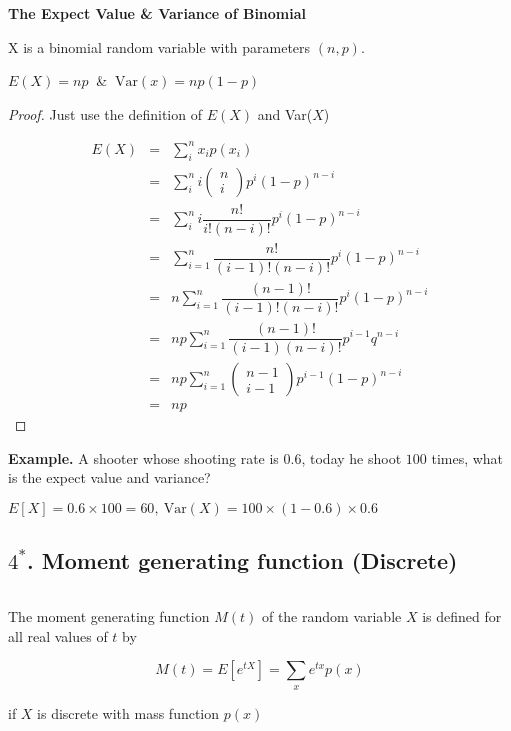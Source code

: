 \newpage

\textbf{The Expect Value \& Variance of Binomial}
$ $

X is a binomial random variable with parameters $(n,p)$.

\begin{center}
	$E(X) = np~$ \& $~\text{Var}(x) = np(1-p)$
\end{center}

\begin{proof}
	Just use the definition of $E(X)$ and Var($X$)
	
	\begin{eqnarray*}
		E(X) &=& \sum_i^n x_ip(x_i)\\
		&=& \sum_i^n i \left(\begin{matrix}
		n \\ i
	\end{matrix}\right) p^i(1 - p)^{n-i}\\
	&=& \sum^n_i i\dfrac{n!}{i!(n-i)!}p^i(1-p)^{n-i}\\
	&=& \sum^n_{i=1}\dfrac{n!}{(i-1)!(n-i)!}p^i(1-p)^{n-i}\\
	&=& n\sum^n_{i=1} \dfrac{(n-1)!}{(i-1)!(n-i)!}p^i(1-p)^{n-i}\\
	&=& np\sum^n_{i=1}\dfrac{(n-1)!}{(i-1)(n-i)!}p^{i-1}q^{n-i}\\
	&=& np\sum^n_{i=1}\left(\begin{matrix}
		n-1 \\ i-1
	\end{matrix}\right)p^{i-1}(1-p)^{n-i}\\
	&=& np
	\end{eqnarray*}
\end{proof}

\textbf{Example.} A shooter whose shooting rate is $0.6$, today he shoot $100$ times, what is the expect value and variance?

\begin{solution}
	$E[X] = 0.6 \times 100 = 60,~\text{Var}(X) = 100 \times (1-0.6) \times 0.6$
\end{solution}






\newpage

\subsection*{$\text{4}^*$. Moment generating function (Discrete)}$ $

\begin{defn}
	The moment generating function $M(t)$ of the random variable $X$ is defined for all real values of $t$ by 
	
	$$M(t) = E\left[e^{tX}\right] = \sum_x e^{tx}p(x)$$
	
	if $X$ is discrete with mass function $p(x)$
\end{defn}

